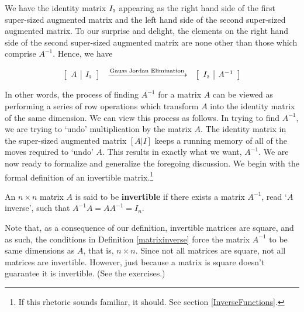 \documentclass{ximera}
\begin{document}
We have the identity matrix $I_{\mbox{\tiny$2$}}$ appearing as the right hand side of the first super-sized augmented matrix and the left hand side of the second super-sized augmented matrix.  To our surprise and delight, the elements on the right hand side of the second super-sized augmented matrix are none other than those which comprise $A^{-1}$.  Hence, we have

\[ \begin{array}{ccc}

\left[ \begin{array}{c|c} A & I_{\mbox{\tiny$2$}} \end{array} \right]

&
\xrightarrow{\text{Gauss Jordan Elimination}}

&

\left[ \begin{array}{c|c} I_{\mbox{\tiny$2$}} & A^{-1} \end{array} \right] 

\end{array}\]

In other words, the process of finding $A^{-1}$ for a matrix $A$ can be viewed as performing a series of row operations which transform $A$ into the identity matrix of the same dimension.  We can view this process as follows.  In trying to find $A^{-1}$, we are trying to `undo' multiplication by the matrix $A$.  The identity matrix in the  super-sized augmented matrix $[A | I]$ keeps a running memory of all of the moves required to `undo' $A$. This results in exactly what we want, $A^{-1}$.  We are now ready to formalize and generalize the foregoing discussion.  We begin with the formal definition of an invertible matrix.\footnote{If this rhetoric sounds familiar, it should. See section \ref{InverseFunctions}.} 

\smallskip

\colorbox{ResultColor}{\bbm

\begin{defn}  \label{matrixinverse}  An $n \times n$ matrix $A$ is said to be \textbf{invertible} if there exists a matrix $A^{-1}$, read `$A$ inverse', such that $A^{-1}A = AA^{-1}=I_{n}$. 
\end{defn}
\ebm}


\smallskip

Note that, as a consequence of our definition, invertible matrices are square, and as such, the conditions in Definition \ref{matrixinverse} force the matrix $A^{-1}$ to be same dimensions as $A$, that is, $n \times n$.  Since not all matrices are square, not all matrices are invertible.  However, just because a matrix is square doesn't guarantee it is invertible.  (See the exercises.)   
\end{document}
